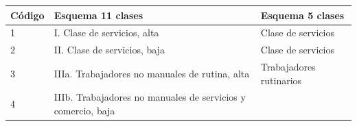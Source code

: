 \documentclass[
]{book}
\begin{document}
\begin{longtable}[]{@{}lll@{}}
\toprule
\begin{minipage}[b]{0.07\columnwidth}\raggedright
Código\strut
\end{minipage} & \begin{minipage}[b]{0.55\columnwidth}\raggedright
Esquema 11 clases\strut
\end{minipage} & \begin{minipage}[b]{0.29\columnwidth}\raggedright
Esquema 5 clases\strut
\end{minipage}\tabularnewline
\midrule
\endhead
\begin{minipage}[t]{0.07\columnwidth}\raggedright
1\strut
\end{minipage} & \begin{minipage}[t]{0.55\columnwidth}\raggedright
I. Clase de servicios, alta\strut
\end{minipage} & \begin{minipage}[t]{0.29\columnwidth}\raggedright
Clase de servicios\strut
\end{minipage}\tabularnewline
\begin{minipage}[t]{0.07\columnwidth}\raggedright
2\strut
\end{minipage} & \begin{minipage}[t]{0.55\columnwidth}\raggedright
II. Clase de servicios, baja\strut
\end{minipage} & \begin{minipage}[t]{0.29\columnwidth}\raggedright
Clase de servicios\strut
\end{minipage}\tabularnewline
\begin{minipage}[t]{0.07\columnwidth}\raggedright
3\strut
\end{minipage} & \begin{minipage}[t]{0.55\columnwidth}\raggedright
IIIa. Trabajadores no manuales de rutina, alta\strut
\end{minipage} & \begin{minipage}[t]{0.29\columnwidth}\raggedright
Trabajadores rutinarios\strut
\end{minipage}\tabularnewline
\begin{minipage}[t]{0.07\columnwidth}\raggedright
4\strut
\end{minipage} & \begin{minipage}[t]{0.55\columnwidth}\raggedright
IIIb. Trabajadores no manuales de servicios y comercio, baja\strut
\end{minipage} & \begin{minipage}[t]{0.29\columnwidth}\raggedright

\end{minipage}
\end{longtable}
\end{document}
